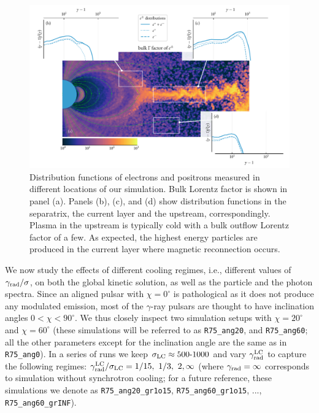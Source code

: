 \begin{figure}[htb]
\centering
\includegraphics[width=\columnwidth,trim={10 0 10 5},clip]{figures/ch3-pulsar/fig7.pdf}
\caption{Distribution functions of electrons and positrons measured in different locations of our simulation. Bulk Lorentz factor is shown in panel (a). Panels (b), (c), and (d) show distribution functions in the separatrix, the current layer and the upstream, correspondingly. Plasma in the upstream is typically cold with a bulk outflow Lorentz factor of a few. As expected, the highest energy particles are produced in the current layer where magnetic reconnection occurs.}
\label{fig:psr-spatial_spectra}
\end{figure}

We now study the effects of different cooling regimes, i.e., different values of $\gamma_{\rm rad}/\sigma$, on both the global kinetic solution, as well as the particle and the photon spectra. Since an aligned pulsar with $\chi=0^\circ$ is pathological as it does not produce any modulated emission, most of the $\gamma$-ray pulsars are thought to have inclination angles $0<\chi<90^\circ$. We thus closely inspect two simulation setups with $\chi=20^\circ$ and $\chi=60^\circ$ (these simulations will be referred to as \texttt{R75\_ang20}, and \texttt{R75\_ang60}; all the other parameters except for the inclination angle are the same as in \texttt{R75\_ang0}). In a series of runs we keep $\sigma_{\rm LC}\approx 500\text{-}1000$ and vary $\gamma_{\rm rad}^{\rm LC}$ to capture the following regimes: $\gamma_{\rm rad}^{\rm LC}/\sigma_{\rm LC}=1/15,~1/3,~2,\infty$ (where $\gamma_{\rm rad}=\infty$ corresponds to simulation without synchrotron cooling; for a future reference, these simulations we denote as \texttt{R75\_ang20\_gr1o15}, \texttt{R75\_ang60\_gr1o15}, ..., \texttt{R75\_ang60\_grINF}).

